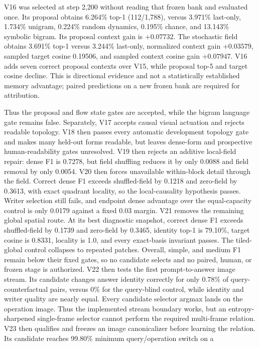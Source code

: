 \documentclass[11pt]{article}
\begin{document}
V16 was selected at step 2,200 without reading that frozen bank and evaluated
once. Its proposal obtains 6.264\% top-1 (112/1,788), versus 3.971\% last-only,
1.734\% unigram, 0.224\% random dynamics, 0.195\% chance, and 13.143\%
symbolic bigram. Its proposal context gain is $+0.07732$. The stochastic field
obtains 3.691\% top-1 versus 3.244\% last-only, normalized context gain
$+0.03579$, sampled target cosine 0.19506, and sampled context cosine gain
$+0.07947$. V16 adds seven correct proposal contexts over V15, while proposal
top-5 and target cosine decline. This is directional evidence and not a
statistically established memory advantage; paired predictions on a new frozen
bank are required for attribution.

Thus the proposal and flow state gates are accepted, while the bigram language
gate remains false. Separately, V17 accepts causal visual actuation and rejects
readable topology. V18 then passes every automatic development topology gate
and makes many held-out forms readable, but leaves dense-form and prospective
human-readability gates unresolved. V19 then rejects an additive local-field
repair: dense F1 is 0.7278, but field shuffling reduces it by only 0.0088 and
field removal by only 0.0054. V20 then forces unavailable within-block detail
through the field. Correct dense F1 exceeds shuffled-field by 0.1218 and
zero-field by 0.3613, with exact quadrant locality, so the local-causality
hypothesis passes. Writer selection still fails, and endpoint dense advantage
over the equal-capacity control is only 0.0179 against a fixed 0.03 margin.
V21 removes the remaining global spatial route. At its best diagnostic
snapshot, correct dense F1 exceeds shuffled-field by 0.1739 and zero-field by
0.3465, identity top-1 is 79.10\%, target cosine is 0.8331, locality is 1.0,
and every exact-basis invariant passes. The tiled-global control collapses to
repeated patches. Overall, simple, and medium F1 remain below their fixed gates,
so no candidate selects and no paired, human, or frozen stage is authorized.
V22 then tests the first prompt-to-answer image stream. Its candidate changes
answer identity correctly for only 0.78\% of query-counterfactual pairs, versus
0\% for the query-blind control, while identity and writer quality are nearly
equal. Every candidate selector argmax lands on the operation image. Thus the
implemented stream boundary works, but an entropy-sharpened single-frame
selector cannot perform the required multi-frame relation.
V23 then qualifies and freezes an image canonicalizer before learning the
relation. Its candidate reaches 99.80\% minimum query/operation switch on a
\end{document}
